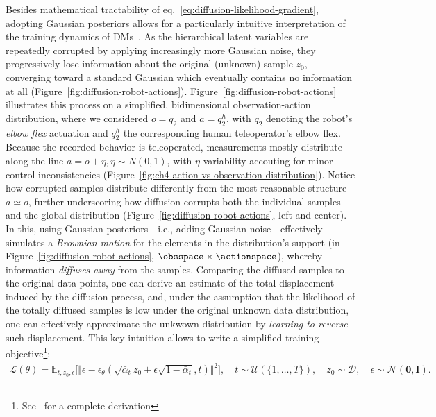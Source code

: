 Besides mathematical tractability of eq.~\ref{eq:diffusion-likelihood-gradient}, adopting Gaussian posteriors allows for a particularly intuitive interpretation of the training dynamics of DMs~\citep{permenterInterpretingImprovingDiffusion2024}. 
As the hierarchical latent variables are repeatedly corrupted by applying increasingly more Gaussian noise, they progressively lose information about the original (unknown) sample \( z_0 \), converging toward a standard Gaussian which eventually contains no information at all (Figure~\ref{fig:diffusion-robot-actions}).
Figure~\ref{fig:diffusion-robot-actions} illustrates this process on a simplified, bidimensional observation-action distribution, where we considered \( o=q_2 \) and \( a=q^h_2 \), with \( q_2 \) denoting the robot's \emph{elbow flex} actuation and \( q^h_2 \) the corresponding human teleoperator's elbow flex.
Because the recorded behavior is teleoperated, measurements mostly distribute along the line \( a = o + \eta, \eta \sim N(0,1) \), with \( \eta \)-variability accouting for minor control inconsistencies (Figure~\ref{fig:ch4-action-vs-observation-distribution}).
Notice how corrupted samples distribute differently from the most reasonable structure \( a \simeq o \), further underscoring how diffusion corrupts both the individual samples and the global distribution (Figure~\ref{fig:diffusion-robot-actions}, left and center).
In this, using Gaussian posteriors---i.e., adding Gaussian noise---effectively simulates a \emph{Brownian motion} for the elements in the distribution's support (in Figure~\ref{fig:diffusion-robot-actions}, \( \obsspace \times \actionspace \)), whereby information \emph{diffuses away} from the samples.
Comparing the diffused samples to the original data points, one can derive an estimate of the total displacement induced by the diffusion process, and, under the assumption that the likelihood of the totally diffused samples is low under the original unknown data distribution, one can effectively approximate the unkwown distribution by \emph{learning to reverse} such displacement.
This key intuition allows to write a simplified training objective\footnote{See~\citet["Three equivalent interpretations"]{luoUnderstandingDiffusionModels2022} for a complete derivation}:
\begin{align}\label{eq:diffusion-simplified-loss}
    \mathcal L(\theta) = \mathbb{E}_{t, z_0, \epsilon} \big[
        \Vert \epsilon - \epsilon_\theta(\sqrt{\bar \alpha_t} z_0 + \epsilon \sqrt{1 - \bar \alpha_t}, t) \Vert^2 \big], \quad t \sim \mathcal{U}(\{1,\dots,T\}), \quad
        z_0 \sim \mathcal{D}, \quad
        \epsilon \sim \mathcal{N}(\mathbf{0},\mathbf{I}).
\end{align}

